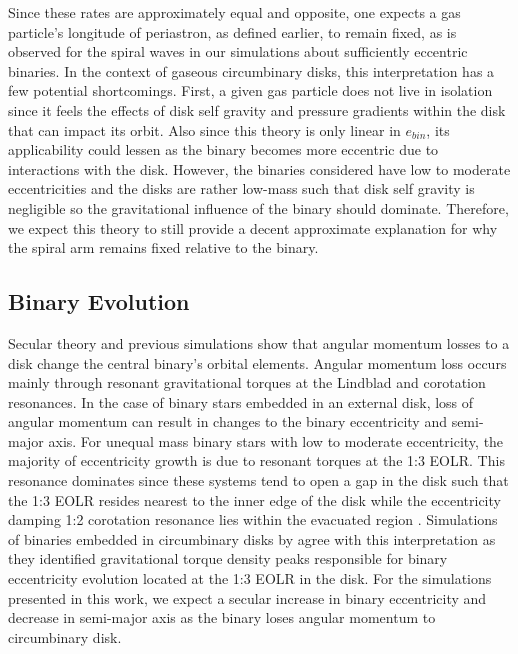 Since these rates are approximately equal and opposite, one expects a
gas particle's longitude of periastron, as defined earlier, to remain
fixed, as is observed for the spiral waves in our simulations about
sufficiently eccentric binaries.  In the context of gaseous circumbinary
disks, this interpretation has a few potential shortcomings.  First, a
given gas particle does not live in isolation since it feels the
effects of disk self gravity and pressure gradients within the disk that can impact its orbit.  Also since this theory is only linear in $e_{bin}$, its applicability could 
lessen as the binary becomes more eccentric due to interactions with the disk.  However, the binaries considered have low to moderate eccentricities and the 
disks are rather low-mass such that disk self gravity is negligible so the gravitational influence of the binary should dominate.  Therefore, we expect this 
theory to still provide a decent approximate explanation for why the spiral arm remains fixed relative to the binary.  
	

\subsection{Binary Evolution} \label{CBDisk:sec:BinaryEvolution}

Secular theory \citep{Goldreich1979,Goldreich1980,Pringle1991,Papaloizou2001} and previous simulations \citep{Artymowicz1991,Cuadra2009,Roedig2012,Dermine2013} show that angular 
momentum losses to a disk change the central binary's orbital elements.  Angular momentum loss occurs mainly through resonant gravitational torques 
at the Lindblad and corotation resonances.  In the case of binary stars embedded in an external disk, loss of angular momentum can result in changes to the 
binary eccentricity and semi-major axis.  For unequal mass binary stars with low to moderate eccentricity, the majority of eccentricity growth is due to resonant 
torques at the 1:3 EOLR.  This resonance dominates since these systems tend to open a gap in the disk such that the 1:3 EOLR resides nearest to the inner 
edge of the disk while the eccentricity damping 1:2 corotation resonance lies within the evacuated region \citep{Artymowicz1991,Artymowicz1992}.  Simulations of
binaries embedded in circumbinary disks by \citet{Roedig2012} agree with this interpretation as they identified gravitational torque density peaks responsible for 
binary eccentricity evolution located at the 1:3 EOLR in the disk.  For the simulations presented in this work, we expect a secular increase in binary eccentricity 
and decrease in semi-major axis as the binary loses angular momentum to circumbinary disk.

